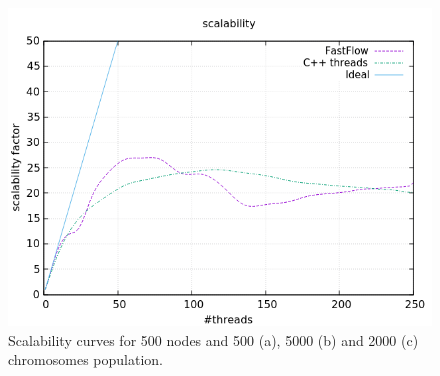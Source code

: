 \documentclass[a4paper,10pt]{article}
\begin{document}
\begin{figure}[H]
\begin{minipage}[t]{0.32\linewidth}
				\subcaption{}
			\end{minipage}
			\begin{minipage}[t]{0.32\linewidth}
				\includegraphics[width=\linewidth]{BenchMarkTSP/scalability/500/SC50020000_zoom.png}
				\subcaption{}
			\end{minipage}
			\caption{Scalability curves for 500 nodes and 500 (a), 5000 (b) and 2000 (c) chromosomes population.}
			\label{500s}
		\end{figure}
	
\end{document}
